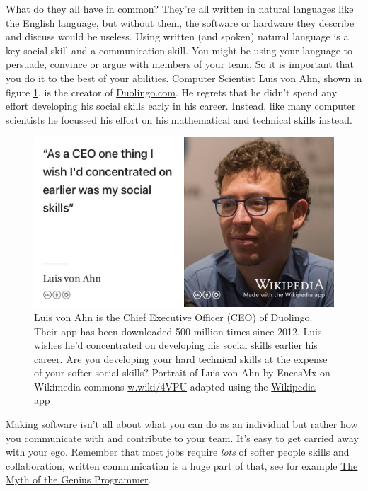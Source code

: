 \documentclass[
]{book}
\begin{document}
What do they all have in common? They're all written in natural languages like the \href{https://en.wikipedia.org/wiki/English_language}{English language}, but without them, the software or hardware they describe and discuss would be useless. Using written (and spoken) natural language is a key social skill and a communication skill. You might be using your language to persuade, convince or argue with members of your team. So it is important that you do it to the best of your abilities. Computer Scientist \href{https://en.wikipedia.org/wiki/Luis_von_Ahn}{Luis von Ahn}, shown in figure \ref{fig:vonahn-fig}, is the creator of \href{https://www.duolingo.com/}{Duolingo.com}. He regrets that he didn't spend any effort developing his social skills early in his career. Instead, like many computer scientists he focussed his effort on his mathematical and technical skills instead. \citep{vonahn}

\begin{figure}

{\centering \includegraphics[width=1\linewidth]{images/luis-von-ahn} 

}

\caption{Luis von Ahn is the Chief Executive Officer (CEO) of Duolingo. Their app has been downloaded 500 million times since 2012. Luis wishes he'd concentrated on developing his social skills earlier his career. Are you developing your hard technical skills at the expense of your softer social skills? Portrait of Luis von Ahn by EneasMx on Wikimedia commons \href{https://w.wiki/4VPU}{w.wiki/4VPU} adapted using the \href{https://apps.apple.com/us/app/wikipedia/id324715238}{Wikipedia app}}\label{fig:vonahn-fig}
\end{figure}



Making software isn't all about what you can do as an individual but rather how you communicate with and contribute to your team. It's easy to get carried away with your ego. Remember that most jobs require \emph{lots} of softer people skills and collaboration, written communication is a huge part of that, see for example \href{https://www.youtube.com/watch?v=0SARbwvhupQ}{The Myth of the Genius Programmer}. \citep{Fitzpatrick}
\end{document}
